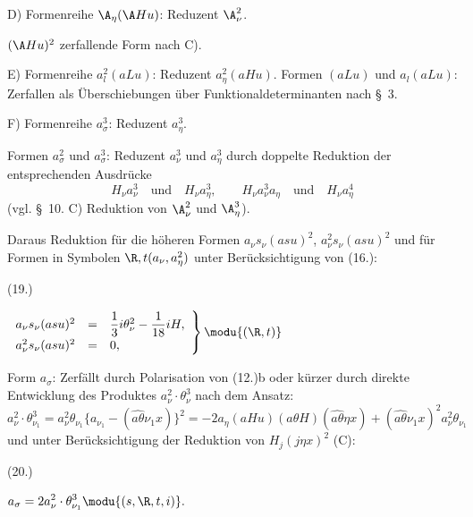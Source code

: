 \noindent D) Formenreihe $\A_\eta(\A Hu)$: Reduzent $\A_\nu^2$.

$(\A Hu)^2$ zerfallende Form nach C).

\noindent E) Formenreihe $a_l^2(aLu)$: Reduzent $a_\eta^2(aHu)$.
Formen $(aLu)$ und $a_l(aLu)$: Zerfallen als Überschiebungen über Funktionaldeterminanten nach \S\ 3.

\noindent F) Formenreihe $a_\sigma^3$: Reduzent $a_\eta^3$.

Formen $a_\sigma^2$ und $a_\sigma^3$: Reduzent $a_\nu^3$ und $a_\eta^3$ durch doppelte Reduktion der entsprechenden Ausdrücke
\[
H_\nu a_\nu^3\quad\text{und}\quad H_\nu a_\eta^3,
\qquad
H_\nu a_\nu^3a_\eta\quad\text{und}\quad H_\nu a_\eta^4
\]
(vgl. \S\ 10. C) Reduktion von $\A_\nu^2$ und $\A_\eta^3$).

Daraus Reduktion für die höheren Formen $a_\nu s_\nu(asu)^2$, $a_\nu^2s_\nu(asu)^2$ und für Formen in Symbolen $\R,t(a_\nu,a_\eta^2)$ unter Berücksichtigung von (16.):
\par\smallskip\noindent
\begin{minipage}[c]{4.8em}
\centering (19.)
\end{minipage}%
\begin{minipage}[c]{\dimexpr\linewidth-4.8em\relax}
\centering
\(\displaystyle
\left.\begin{array}{rcl}
a_\nu s_\nu(asu)^2&=&\dfrac13 i\theta_\nu^2-\dfrac1{18}iH,\\[0.5em]
a_\nu^2s_\nu(asu)^2&=&0,
\end{array}\right\}\modu{(\R,t)}
\)
\end{minipage}
\par\smallskip
Form $a_\sigma$: Zerfällt durch Polarisation von (12.)b oder kürzer durch direkte Entwicklung des Produktes $a_\nu^2\cdot\theta_\nu^3$ nach dem Ansatz:
\[
a_\nu^2\cdot\theta_{\nu_1}^3=a_\nu^2\theta_{\nu_1}\{a_{\nu_1}-(\widehat{a\theta}\nu_1x)\}^2
=-2a_\eta(aHu)(a\theta H)(\widehat{a\theta}\eta x)+(\widehat{a\theta}\nu_1x)^2a_\nu^2\theta_{\nu_1}
\]
und unter Berücksichtigung der Reduktion von $H_j(j\eta x)^2$ (C):
\par\smallskip\noindent
\begin{minipage}[c]{4.8em}
\centering (20.)
\end{minipage}%
\begin{minipage}[c]{\dimexpr\linewidth-4.8em\relax}
\centering
\(\displaystyle a_\sigma=2a_\nu^2\cdot\theta_{\nu_1}^3\modu{(s,\R,t,i)}.\)
\end{minipage}
\par\smallskip

